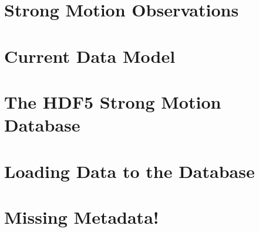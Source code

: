 \section{Strong Motion Observations}
\label{sec:data_model}

\section{Current Data Model}

\section{The HDF5 Strong Motion Database}

\section{Loading Data to the Database}

\section{Missing Metadata!}

